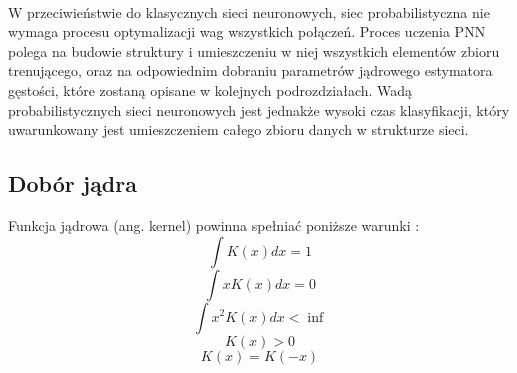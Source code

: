 \documentclass[a4paper,12pt,twoside]{article}
\begin{document}
\paragraph{}
W przeciwieństwie do klasycznych sieci neuronowych, siec probabilistyczna nie wymaga procesu optymalizacji wag wszystkich połączeń. Proces uczenia PNN polega na budowie struktury i umieszczeniu w niej wszystkich elementów zbioru trenującego, oraz na odpowiednim dobraniu parametrów jądrowego estymatora gęstości, które zostaną opisane w kolejnych podrozdziałach. Wadą probabilistycznych sieci neuronowych jest jednakże wysoki czas klasyfikacji, który uwarunkowany jest umieszczeniem całego zbioru danych w strukturze sieci.
\subsection{Dobór jądra}
Funkcja jądrowa (ang. kernel) powinna spełniać poniższe warunki \cite{kde2}:
\begin{equation} \int K(x)dx=1
\end{equation}
\begin{equation} \int xK(x)dx=0
\end{equation}
\begin{equation} \int x^2K(x)dx<\inf
\end{equation}
\begin{equation}  K(x)>0
\end{equation}
\begin{equation}  K(x)=K(-x)
\end{equation}
\end{document}
